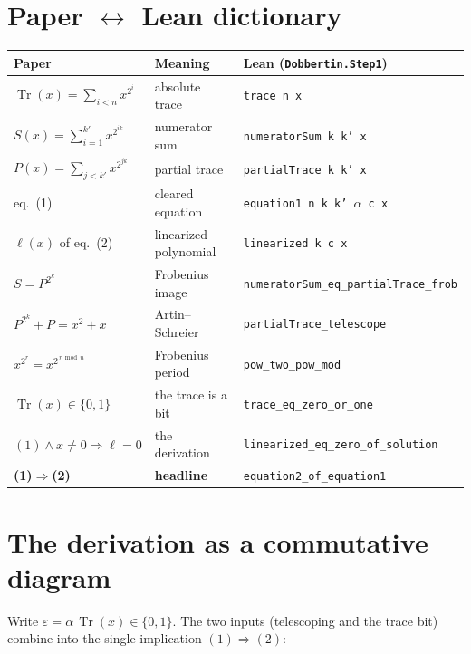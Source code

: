 \documentclass[11pt]{article}
\newcommand{\lc}[1]{\texttt{#1}}
\newcommand{\Tr}{\operatorname{Tr}}
\begin{document}
\section{Paper $\leftrightarrow$ Lean dictionary}
\begin{center}\small
\begin{tabular}{@{}lll@{}}
\toprule
\textbf{Paper} & \textbf{Meaning} & \textbf{Lean (\lc{Dobbertin.Step1})}\\
\midrule
$\Tr(x)=\sum_{i<n}x^{2^i}$          & absolute trace          & \lc{trace n x}\\
$S(x)=\sum_{i=1}^{k'}x^{2^{ik}}$    & numerator sum           & \lc{numeratorSum k k' x}\\
$P(x)=\sum_{j<k'}x^{2^{jk}}$        & partial trace           & \lc{partialTrace k k' x}\\
eq.~(1)                             & cleared equation        & \lc{equation1 n k k' \(\alpha\) c x}\\
$\ell(x)$ of eq.~(2)               & linearized polynomial   & \lc{linearized k c x}\\
\midrule
$S=P^{2^k}$                         & Frobenius image         & \lc{numeratorSum\_eq\_partialTrace\_frob}\\
$P^{2^k}+P=x^2+x$                   & Artin--Schreier         & \lc{partialTrace\_telescope}\\
$x^{2^r}=x^{2^{\,r\bmod n}}$        & Frobenius period        & \lc{pow\_two\_pow\_mod}\\
$\Tr(x)\in\{0,1\}$                  & the trace is a bit      & \lc{trace\_eq\_zero\_or\_one}\\
$(1)\wedge x\neq0\Rightarrow\ell=0$ & the derivation          & \lc{linearized\_eq\_zero\_of\_solution}\\
\textbf{(1)}$\Rightarrow$\textbf{(2)} & \textbf{headline}     & \lc{equation2\_of\_equation1}\\
\bottomrule
\end{tabular}
\end{center}

\section{The derivation as a commutative diagram}
Write $\varepsilon=\alpha\,\Tr(x)\in\{0,1\}$.  The two inputs (telescoping and
the trace bit) combine into the single implication $(1)\Rightarrow(2)$:
\end{document}
